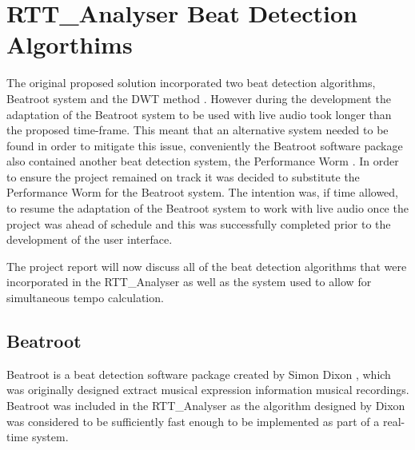 \documentclass[a4paper, 11pt]{article}
\begin{document}
\maketitle{}\section{RTT\_Analyser Beat Detection Algorthims}
The original proposed solution incorporated two beat detection algorithms, Beatroot system \cite{dixon1} and the DWT method \cite{tzane1}. However during the development the adaptation of the Beatroot system to be used with live audio took longer than the proposed time-frame. This meant that an alternative system needed to be found in order to mitigate this issue, conveniently the Beatroot software package also contained another beat detection system, the Performance Worm \cite{dixon3}. In order to ensure the project remained on track it was decided to substitute the Performance Worm for the Beatroot system. The intention was, if time allowed, to resume the adaptation of the Beatroot system to work with live audio once the project was ahead of schedule and this was successfully completed prior to the development of the user interface.

The project report will now discuss all of the beat detection algorithms that were incorporated in the RTT\_Analyser as well as the system used to allow for simultaneous tempo calculation.  

\subsection{Beatroot}
Beatroot is a beat detection software package created by Simon Dixon \cite{dixon1}, which was originally designed extract musical expression information musical recordings\cite{dixon3}. Beatroot was included in the RTT{\_}Analyser as the algorithm designed by Dixon was considered to be sufficiently fast enough to be implemented as part of a real-time system\cite{dixon4}.\par
\end{document}
